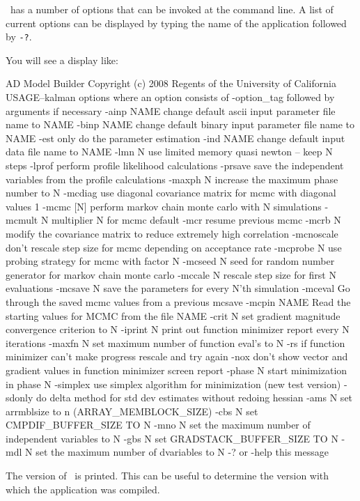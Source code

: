 %
%

\ADM\ has a number of options that can be invoked at the command line.
A list of current options can be displayed by typing the name of the application followed by \texttt{-?}. 

\medskip

You will see a display like:
\begin{code}
 AD Model Builder Copyright (c) 2008 Regents of the University of California
 USAGE--kalman options
 where an option consists of -option_tag followed by arguments if necessary
 -ainp NAME      change default ascii input parameter file name to NAME
 -binp NAME      change default binary input parameter file name to NAME
 -est            only do the parameter estimation
 -ind NAME       change default input data file name to NAME
 -lmn N          use limited memory quasi newton -- keep N steps
 -lprof          perform profile likelihood calculations
 -prsave         save the independent variables from the profile calculations
 -maxph N        increase the maximum phase number to N
 -mcdiag         use diagonal covariance matrix for mcmc with diagonal values 1
 -mcmc [N]       perform markov chain monte carlo with N simulations
 -mcmult N       multiplier N for mcmc default
 -mcr            resume previous mcmc
 -mcrb N         modify the covariance matrix to reduce extremely high correlation      
 -mcnoscale      don't rescale step size for mcmc depending on acceptance rate
 -mcprobe N      use probing strategy for mcmc with factor N
 -mcseed N       seed for random number generator for markov chain monte carlo
 -mccale N       rescale step size for first N evaluations
 -mcsave N       save the parameters for every N'th simulation
 -mceval         Go through the saved mcmc values from a previous mcsave
 -mcpin NAME      Read the starting values for MCMC from the file NAME
 -crit N         set gradient magnitude convergence criterion to N
 -iprint N       print out function minimizer report every N iterations
 -maxfn N        set maximum number of function eval's to N
 -rs             if function minimizer can't make progress rescale and try again
 -nox            don't show vector and gradient values in function minimizer screen
                 report
 -phase N        start minimization in phase N
 -simplex        use simplex algorithm for minimization (new test version)
 -sdonly         do delta method for std dev estimates without redoing hessian
 -ams N          set arrmblsize to n (ARRAY_MEMBLOCK_SIZE) 
 -cbs N          set CMPDIF_BUFFER_SIZE TO N 
 -mno N          set the maximum number of independent variables to N
 -gbs N          set GRADSTACK_BUFFER_SIZE TO N 
 -mdl N          set the maximum number of dvariables to N
 -? or -help     this message
\end{code}
The version of \ADM\ is printed. This can be useful to determine
the version with which the application was compiled.

